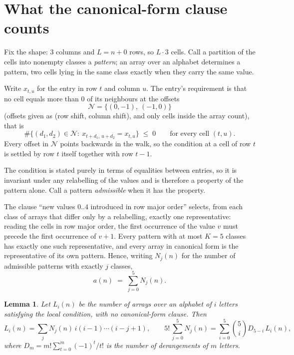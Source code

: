 \documentclass[11pt,a4paper]{article}
\theoremstyle{plain}
\newtheorem{lemma}[theorem]{Lemma}
\theoremstyle{definition}
\begin{document}
\section{What the canonical-form clause counts}

Fix the shape: $3$ columns and $L=n+0$ rows, so $L\cdot3$ cells. Call a
partition of the cells into nonempty classes a \emph{pattern}; an array over an alphabet
determines a pattern, two cells lying in the same class exactly when they carry the same
value.

Write $x_{t,u}$ for the entry in row $t$ and column $u$. The
entry's requirement is that no cell equals more than $0$ of its neighbours at the
offsets
\[
\mathcal N=\{(0,-1),\ (-1,0)\}
\]
(offsets given as (row shift, column shift), and only cells inside the array count),
that is
\begin{equation}\label{eq:loc}
\#\bigl\{(d_1,d_2)\in\mathcal N:\ x_{t+d_1,\,u+d_2}=x_{t,u}\bigr\}\;\le\;0
\qquad\text{for every cell }(t,u).
\end{equation}
Every offset in $\mathcal N$ points backwards in the walk, so the condition at a cell of
row $t$ is settled by row $t$ itself together with row $t-1$.

The condition is stated purely in terms of equalities between entries, so it is invariant
under any relabelling of the values and is therefore a property of the pattern alone. Call a
pattern \emph{admissible} when it has the property.

The clause ``new values $0..4$ introduced in row major order'' selects, from each class
of arrays that differ only by a relabelling, exactly one representative: reading the cells in
row major order, the first occurrence of the value $v$ must precede the first occurrence of
$v+1$. Every pattern with at most $K=5$ classes has exactly one such representative, and
every array in canonical form is the representative of its own pattern. Hence, writing
$N_j(n)$ for the number of admissible patterns with exactly $j$ classes,
\begin{equation}\label{eq:apat}
a(n)\;=\;\sum_{j=0}^{5}N_j(n).
\end{equation}

\begin{lemma}\label{lem:inv}
Let $L_i(n)$ be the number of arrays over an alphabet of $i$ letters satisfying the local
condition, with no canonical-form clause. Then
\[
L_i(n)=\sum_j N_j(n)\,i(i-1)\cdots(i-j+1),
\qquad
5!\,\sum_{j=0}^{5}N_j(n)=\sum_{i=0}^{5}\binom{5}{i}D_{5-i}\,L_i(n),
\]
where $D_m=m!\sum_{t=0}^{m}(-1)^t/t!$ is the number of derangements of $m$ letters.
\end{lemma}
\end{document}

